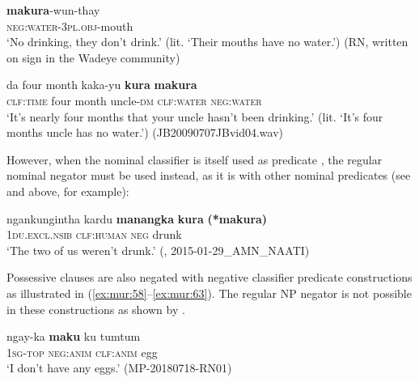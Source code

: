 \documentclass[output=paper,colorlinks,citecolor=brown]{langscibook}
\begin{document}
\ea\label{ex:mur:55}
    \gll \textbf{makura}{}-wun-thay\\
         \textsc{neg:water-3pl.obj}-mouth\\
    \glt ‘No drinking, they don’t drink.’ (lit. ‘Their mouths have no water.’) (RN, written on sign in the Wadeye community) 
\z

\ea\label{ex:mur:56} 
    \gll da four month kaka-yu \textbf{kura} \textbf{makura}\\
          \textsc{clf:time} four month uncle\textsc{{}-dm} \textsc{clf:water} \textsc{neg:water}\\
    \glt ‘It's nearly four months that your uncle hasn't been drinking.’ (lit. ‘It’s four months uncle has no water.’) (JB20090707JBvid04.wav)
\z 

However, when the nominal classifier is itself used as predicate , the regular nominal negator must be used instead, as it is with other nominal predicates (see  and  above, for example):

\ea\label{ex:mur:57} 
    \gll ngankungintha kardu \textbf{manangka} \textbf{kura} \textbf{(*makura)}\\
          \textsc{1du.excl.nsib} \textsc{clf:human} \textsc{neg} drunk\\
    \glt ‘The two of us weren’t drunk.’ (\citealt{MansfieldEtAl2019}, 2015-01-29\_AMN\_NAATI)
\z 

Possessive clauses are also negated with negative classifier predicate constructions as illustrated in (\ref{ex:mur:58}--\ref{ex:mur:63}). The regular NP negator is not possible in these constructions as shown by . 

\ea\label{ex:mur:58}
    \z
\z 

\ea\label{ex:mur:59}
    \gll ngay-ka \textbf{maku} ku tumtum \\
          \textsc{1sg-top} \textsc{neg:anim} \textsc{clf:anim} egg\\
    \glt ‘I don’t have any eggs.’ (MP-20180718-RN01)
\z 
\end{document}
